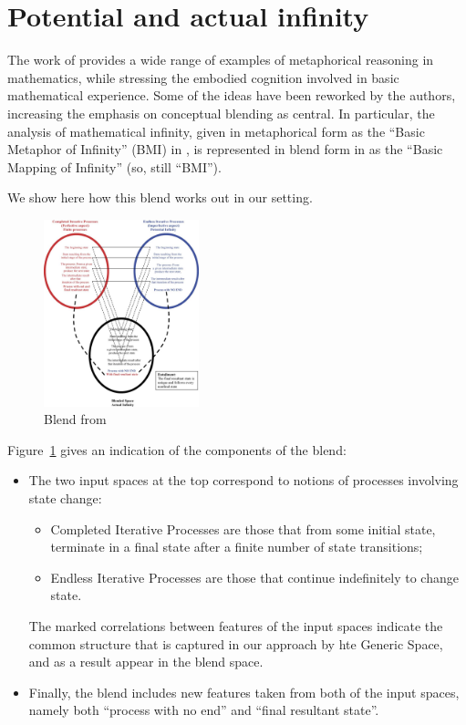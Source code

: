 \section{Potential and actual infinity}

The work of \textcite{Lak00} provides a wide range of examples of
metaphorical reasoning in mathematics, while stressing the embodied
cognition involved in basic mathematical experience.  Some of
the ideas have been reworked by the authors, increasing the emphasis on
conceptual blending as central.  In particular, the analysis of
mathematical infinity, given in metaphorical form as the ``Basic Metaphor
of Infinity'' (BMI) in \textcite{Lak00}, is represented in blend form
in \textcite{nunez05} as the ``Basic Mapping of Infinity'' (so, still ``BMI'').

We show here how this blend works out in our setting.

\begin{figure}[h]
  \centering
\includegraphics[width=0.4\textwidth]{transfin_nunez}  
  \caption{Blend from \textcite[p ??]{nunez05}}
  \label{fig:nunez_transfin}
\end{figure}

Figure~\ref{fig:nunez_transfin} gives an indication of the components
of the blend:
\begin{itemize}
\item The two input spaces at the top correspond to notions
of processes involving state change:
\begin{itemize}
\item  Completed Iterative Processes
are those that from some initial state, terminate in a final state
after a finite number of state transitions;
\item 
Endless Iterative Processes are those that continue indefinitely
to change state.
\end{itemize}
The marked correlations between features of the input spaces
indicate the common structure that is captured in our approach
by hte Generic Space, and as a result appear in the blend space.
\item 
Finally, the blend includes new features taken from both of the
input spaces, namely both ``process with no end'' and 
``final resultant state''.
\end{itemize}


